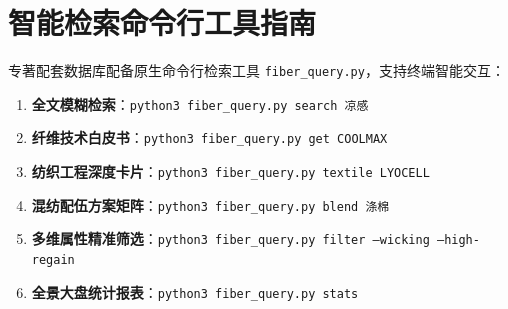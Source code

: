 \documentclass[11pt,openright,twoside,UTF8]{ctexbook}
\begin{document}
\chapter{智能检索命令行工具指南}

专著配套数据库配备原生命令行检索工具 \texttt{fiber\_query.py}，支持终端智能交互：

\begin{enumerate} \small \setlength{\itemsep}{3pt}
    \item \textbf{全文模糊检索}：\texttt{python3 fiber\_query.py search 凉感}
    \item \textbf{纤维技术白皮书}：\texttt{python3 fiber\_query.py get COOLMAX}
    \item \textbf{纺织工程深度卡片}：\texttt{python3 fiber\_query.py textile LYOCELL}
    \item \textbf{混纺配伍方案矩阵}：\texttt{python3 fiber\_query.py blend 涤棉}
    \item \textbf{多维属性精准筛选}：\texttt{python3 fiber\_query.py filter --wicking --high-regain}
    \item \textbf{全景大盘统计报表}：\texttt{python3 fiber\_query.py stats}
\end{enumerate}
\end{document}
